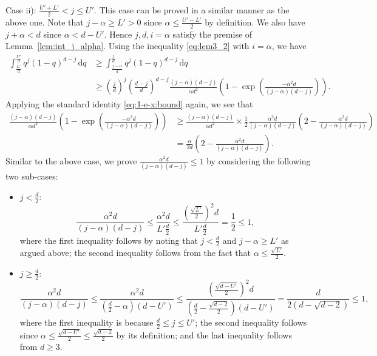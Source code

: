 \documentclass[onecolumn,letterpaper]{IEEEtran}
\newcommand{\cp}{{q}}
\newcommand{\up}{{U}}
\newcommand{\lw}{{L}}
\newcommand*{\dif}{{\,\mathrm{d}}}
\newcommand{\ap}{{\alpha}}
\begin{document}
\begin{IEEEproof}
Case ii): $\frac{\up'+\lw'}{2} < j \le \up'$. This case can be proved in a similar manner as the above one. Note that $j-\ap\geq \lw'>0$ since $\ap\leq \frac{\up'-\lw'}{2}$ by definition. We also have $j+\ap<d$ since $\ap<d-\up'$. Hence $j,d,i=\ap$ satisfy the premise of Lemma~\ref{lem:int_j_alpha}. Using the inequality \eqref{eq:lem3_2} with $i=\ap$, we have 
\begin{align*}
\int_{\frac {\lw'}{d}}^{\frac {\up'}{d}} \cp^j (1-\cp)^{d-j} \dif \cp &\geq \int_{\frac {j-\ap}{d}}^{\frac j d} \cp^j (1-\cp)^{d-j} \dif \cp \\ 
&\geq \left( \frac{j}{d} \right)^j \left( \frac{d-j}{d} \right)^{d-j} \frac{(j-\ap)(d-j)}{\ap   d^2} \left( 1 - \exp\left( \frac{-\ap^2  d}{(j-\ap)(d-j)} \right) \right).
\end{align*}
Applying the standard identity \eqref{eq:1-e-x:bound} again, we see that 
\begin{align*}
\frac{(j-\ap)(d-j)}{\ap d^2} \left( 1 - \exp\left( \frac{-\ap^2 d}{(j-\ap)(d-j)} \right) \right) &\ge \frac{(j-\ap)(d-j)}{\ap  d^2} \times \frac{1}{2} \frac{\ap^2 d } {(j-\ap)(d-j)} \left(2 - \frac{\ap^2 d}{(j-\ap)(d-j)}\right) \\ 
&= \frac{\ap}{2d} \left(2 - \frac{\ap^2  d}{(j-\ap)(d-j)}\right).
\end{align*}
Similar to the above case, we prove $\frac{\ap^2d}{(j-\ap)(d-j)}\leq 1$ by considering the following two sub-cases: 
\begin{itemize}
    \item \underline{$j < \frac{d}{2}$}: 
\begin{equation*}
\frac{\ap^2d}{(j-\ap)(d-j)} \leq \frac{\ap^2d}{\lw' \frac d 2}  \leq \frac{ \left(\frac{\sqrt{\lw'}}{2}\right)^2d}{\lw' \frac d 2} = \frac{1}{2} \leq  1,
\end{equation*}
where the first inequality follows by noting that $j < \frac{d}{2}$ and $j-\ap\geq \lw'$ as argued above; the second inequality follows from the fact that $\ap \leq \frac{\sqrt{\lw'}}{2}$. 
\item {\underline{$j \ge \frac{d}{2}$}:} {
\begin{equation*}
\frac{\ap^2d}{(j-\ap)(d-j)} \leq \frac{\ap^2d}{\left(\frac{d}{2} -\ap\right)(d-\up')} \leq \frac{ \left(\frac{\sqrt{d-\up'}}{2}\right)^2d}{\left(\frac{d}{2}-\frac {\sqrt{d-2}}{2}\right) (d-\up')} = \frac{d}{2\left(d-\sqrt{d-2}\right)} \leq  1,
\end{equation*}
where the first inequality is because $\frac{d}{2} \leq j\leq \up' $; the second inequality follows since $\ap \leq \frac{\sqrt{d-\up'}}{2}\leq \frac{\sqrt{d-2}}{2}$ by its definition; and the last inequality follows from $d\geq 3$. }

\end{itemize}
\end{IEEEproof}
\end{document}
